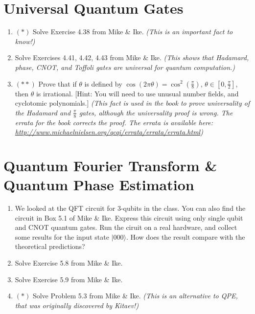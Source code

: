 \documentclass[10pt]{article}
\newcounter{ex}
\theoremstyle{plain}
\theoremstyle{definition}
\begin{document}
\section{Universal Quantum Gates}

\begin{enumerate}[label=(\roman*)]

\item $(\ast)$ Solve Exercise 4.38 from Mike \& Ike. \textit{(This is an important fact to know!)}

\item Solve Exercises 4.41, 4.42, 4.43 from Mike \& Ike. \textit{(This shows that Hadamard, phase, CNOT, and Toffoli gates are universal for quantum computation.)}

\item $(\ast \ast)$ Prove that if $\theta$ is defined by $\cos{(2\pi \theta)} = \cos^2 \left( \frac{\pi}{8} \right)$, $\theta \in [0, \frac{\pi}{2}]$, then $\theta$ is irrational. [Hint: You will need to use unusual number fields, and cyclotomic polynomials.] \textit{(This fact is used in the book to prove universality of the Hadamard and $\frac{\pi}{8}$ gates, although the universality proof is wrong. The errata for the book corrects the proof. The errata is available here: \url{http://www.michaelnielsen.org/qcqi/errata/errata/errata.html})}
\end{enumerate}

\section{Quantum Fourier Transform \& Quantum Phase Estimation}

\begin{enumerate}[label=(\roman*)]

\item We looked at the QFT circuit for 3-qubits in the class. You can also find the circuit in Box 5.1 of Mike \& Ike. Express this circuit using only single qubit and CNOT quantum gates. Run the ciruit on a real hardware, and collect some results for the input state $|000\rangle$. How does the result compare with the theoretical predictions?

\item Solve Exercise 5.8 from Mike \& Ike.

\item Solve Exercise 5.9 from Mike \& Ike.

\item $(\ast)$ Solve Problem 5.3 from Mike \& Ike. \textit{(This is an alternative to QPE, that was originally discovered by Kitaev!)}

\end{enumerate}
\end{document}
